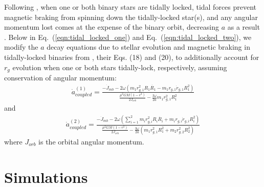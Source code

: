 \documentclass[twocolumn]{aastex61}
\begin{document}
Following \citet{Fleming2018}, when one or both binary stars are tidally locked, tidal forces prevent magnetic braking from spinning down the tidally-locked star(s), and any angular momentum lost comes at the expense of the binary orbit, decreasing $a$ as a result \citep{Verbunt1981}.  Below in Eq.~(\ref{eqn:tidal_locked_one}) and Eq.~(\ref{eqn:tidal_locked_two}), we modify the $a$ decay equations due to stellar evolution and magnetic braking in tidally-locked binaries from \citet{Fleming2018}, their Eqs. (18) and (20), to additionally account for $r_g$ evolution when one or both stars tidally-lock, respectively, assuming conservation of angular momentum:
\small
\begin{equation} \label{eqn:tidal_locked_one}
\begin{split}
\dot{a}_{coupled}^{(1)} = \frac{-\dot{J}_{mb} - 2 \omega \left( m_1 r_{g,1}^2 R_1 \dot{R_1} - m_1 r_{g,1} \dot{r}_{g,1} R_1^2 \right)}
{\frac{\mu^2 G M (1-e^2)}{2J_{orb}} - \frac{3 \omega}{2a} m_1 r_{g,1}^2 R_1^2}
\end{split}
\end{equation}
\normalsize
and
\small
\begin{equation} \label{eqn:tidal_locked_two}
\begin{split}
\dot{a}_{coupled}^{(2)} = \frac{-\dot{J}_{mb} - 2 \omega \left( \sum_{i=1}^{2} m_i r_{g,i}^2 R_i \dot{R_i} + m_i r_{g,i} \dot{r}_{g,i} R_i^2 \right)}
{\frac{\mu^2 G M (1-e^2)}{2J_{orb}} - \frac{3 \omega}{2a} \left( m_1 r_{g,1}^2 R_1^2 + m_2 r_{g,2}^2 R_2^2 \right)}
\end{split}
\end{equation}
\normalsize
where $J_{orb}$ is the orbital angular momentum.

\section{Simulations} \label{sec:simulations}
\end{document}

